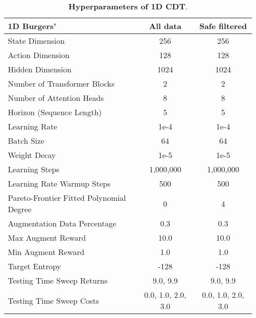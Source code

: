 \begin{table}[ht]
  \begin{center}
    \caption{\textbf{Hyperparameters of 1D CDT}.}
     \label{tab:1d_cdt}
    \begin{tabular}{l|c|c}
    \hline
    {1D Burgers'} & {All data} & {Safe filtered} \\
    \hline
    State Dimension                          & 256                & 256                \\
    Action Dimension                         & 128                & 128                \\
    Hidden Dimension                         & 1024               & 1024               \\
    Number of Transformer Blocks             & 2                  & 2                  \\
    Number of Attention Heads                & 8                  & 8                  \\
    Horizon (Sequence Length)                & 5                  & 5                  \\
    Learning Rate                            & 1e-4               & 1e-4               \\
    Batch Size                               & 64                 & 64                 \\
    Weight Decay                             & 1e-5               & 1e-5               \\
    Learning Steps                           & 1,000,000          & 1,000,000          \\
    Learning Rate Warmup Steps               & 500                & 500                \\
    Pareto-Frontier Fitted Polynomial Degree & 0                  & 4                  \\
    Augmentation Data Percentage             & 0.3                & 0.3                \\
    Max Augment Reward                       & 10.0               & 10.0               \\
    Min Augment Reward                       & 1.0                & 1.0                \\
    Target Entropy                           & -128               & -128               \\
    Testing Time Sweep Returns               & 9.0, 9.9           & 9.0, 9.9           \\
    Testing Time Sweep Costs                 & 0.0, 1.0, 2.0, 3.0 & 0.0, 1.0, 2.0, 3.0 \\ \hline
    \end{tabular}
  \end{center}
\end{table}

